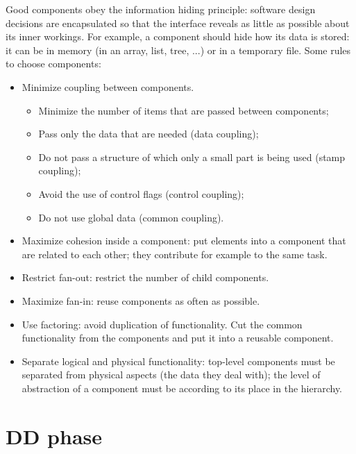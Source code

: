 Good components obey the information hiding principle: software design decisions are encapsulated so that the interface reveals as little as possible about its inner workings. For example, a component should hide how its data is stored: it can be in memory (in an array, list, tree, ...) or in a temporary file.
Some rules to choose components:
\begin{itemize}
	\item Minimize coupling between components.
	\begin{itemize}
		\item Minimize the number of items that are passed between components;
		\item Pass only the data that are needed (data coupling);
		\item Do not pass a structure of which only a small part is being used (stamp coupling);
		\item Avoid the use of control flags (control coupling);
		\item Do not use global data (common coupling).
	\end{itemize}
	\item Maximize cohesion inside a component: put elements into a component that are related to each other; they contribute for example to the same task.
	\item Restrict fan-out: restrict the number of child components.
	\item Maximize fan-in: reuse components as often as possible.
	\item Use factoring: avoid duplication of functionality. Cut the common functionality from the components and put it into a reusable component.
	\item Separate logical and physical functionality: top-level components must be separated from physical aspects (the data they deal with); the level of abstraction of a component must be according to its place in the hierarchy.
\end{itemize}

\section{DD phase}
